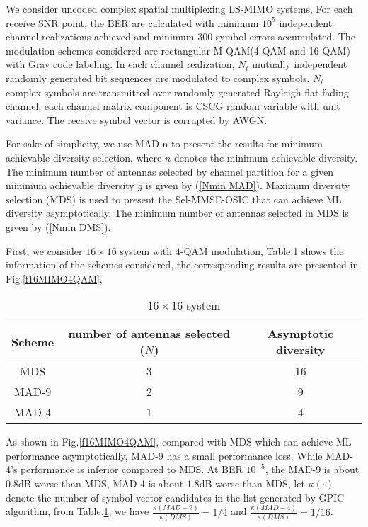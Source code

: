 \documentclass[12pt, draftclsnofoot, onecolumn]{IEEEtran}
\begin{document}
We consider uncoded complex spatial multiplexing LS-MIMO systems, For each receive SNR point, the BER are calculated with minimum $10^{5}$ independent channel realizations achieved and minimum 300 symbol errors accumulated. The modulation schemes considered are rectangular M-QAM(4-QAM and 16-QAM) with Gray code labeling. In each channel realization, $N_{t}$ mutually independent randomly generated bit sequences are modulated to complex symbols. $N_{t}$ complex symbols are transmitted over randomly generated Rayleigh flat fading channel, each channel matrix component is CSCG random variable with unit variance. The receive symbol vector is corrupted by AWGN.

For sake of simplicity, we use MAD-n to present the results for minimum achievable diversity selection, where $n$ denotes the minimum achievable diversity. The minimum number of antennas selected by channel partition for a given minimum achievable diversity $g$ is given by (\ref{Nmin MAD}). Maximum diversity selection (MDS) is used to present the Sel-MMSE-OSIC that can achieve ML diversity asymptotically. The minimum number of antennas selected in MDS is given by (\ref{Nmin DMS}).

First, we consider $16\times 16$ system with $4$-QAM modulation, Table.\ref{t16MIMO4QAM} shows the information of the schemes considered, the corresponding results are presented in Fig.\ref{f16MIMO4QAM}, 
\begin{table}[htb]
\renewcommand{\arraystretch}{1.3}
\caption{$16\times 16$ system}
\label{t16MIMO4QAM}
\centering
\begin{tabular}{|c|c|c|}
\hline
Scheme&number of antennas selected ($N$)&Asymptotic diversity\\
\hline 
MDS&3&16\\
\hline
MAD-9&2&9\\
\hline
MAD-4&1&4\\
\hline
\end{tabular}
\end{table}

As shown in Fig.\ref{f16MIMO4QAM}, compared with MDS which can achieve ML performance asymptotically, MAD-9 has a small performance loss. While MAD-4's performance is inferior compared to MDS. At BER $10^{-5}$, the MAD-9 is about $0.8$dB worse than MDS, MAD-4 is about $1.8$dB worse than MDS, let $\kappa(\cdot)$ denote the number of symbol vector candidates in the list generated by GPIC algorithm\cite{radji2009interference}, from Table.\ref{t16MIMO4QAM}, 
we have $\frac{\kappa(MAD-9)}{\kappa(DMS)}=1/4$ and $\frac{\kappa(MAD-4)}{\kappa(DMS)}=1/16$.
\end{document}
